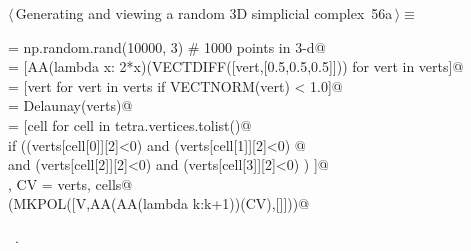 \documentclass[11pt,oneside]{article}    %
\begin{document}
\begin{flushleft} \small \label{scrap101}
\protect{}$\langle\,$Generating and viewing a random 3D simplicial complex\nobreak\ {\footnotesize 56a}$\,\rangle\equiv$
\vspace{-1ex}
\begin{list}{}{} \item
\mbox{}\verb@verts = np.random.rand(10000, 3) # 1000 points in 3-d@\\
\mbox{}\verb@verts = [AA(lambda x: 2*x)(VECTDIFF([vert,[0.5,0.5,0.5]])) for vert in verts]@\\
\mbox{}\verb@verts = [vert for vert in verts if VECTNORM(vert) < 1.0]@\\
\mbox{}\verb@tetra = Delaunay(verts)@\\
\mbox{}\verb@cells = [cell for cell in tetra.vertices.tolist()@\\
\mbox{}\verb@         if  ((verts[cell[0]][2]<0) and (verts[cell[1]][2]<0) @\\
\mbox{}\verb@                 and (verts[cell[2]][2]<0) and (verts[cell[3]][2]<0) ) ]@\\
\mbox{}\verb@V, CV = verts, cells@\\
\mbox{}\verb@VIEW(MKPOL([V,AA(AA(lambda k:k+1))(CV),[]]))@\\
\mbox{}\verb@@{\NWsep}
\end{list}
\vspace{-1ex}
\footnotesize\addtolength{\baselineskip}{-1ex}
\begin{list}{}{\setlength{\itemsep}{-\parsep}\setlength{\itemindent}{-\leftmargin}}
\item \NWtxtMacroRefIn\ .
\end{list}
\end{flushleft}
\end{document}
